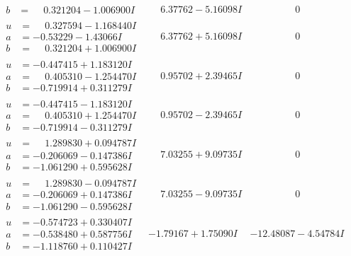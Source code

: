 \documentclass[1p]{elsarticle_modified}
\theoremstyle{definition}
\begin{document}
$$\begin{array}{c|c|c}
\begin{aligned}
b &= \phantom{-}0.321204 - 1.006900 I\end{aligned}
 & \phantom{-}6.37762 - 5.16098 I & \phantom{-0.000000 } 0 \\ \hline\begin{aligned}
u &= \phantom{-}0.327594 - 1.168440 I \\
a &= -0.53229 - 1.43066 I \\
b &= \phantom{-}0.321204 + 1.006900 I\end{aligned}
 & \phantom{-}6.37762 + 5.16098 I & \phantom{-0.000000 } 0 \\ \hline\begin{aligned}
u &= -0.447415 + 1.183120 I \\
a &= \phantom{-}0.405310 - 1.254470 I \\
b &= -0.719914 + 0.311279 I\end{aligned}
 & \phantom{-}0.95702 + 2.39465 I & \phantom{-0.000000 } 0 \\ \hline\begin{aligned}
u &= -0.447415 - 1.183120 I \\
a &= \phantom{-}0.405310 + 1.254470 I \\
b &= -0.719914 - 0.311279 I\end{aligned}
 & \phantom{-}0.95702 - 2.39465 I & \phantom{-0.000000 } 0 \\ \hline\begin{aligned}
u &= \phantom{-}1.289830 + 0.094787 I \\
a &= -0.206069 - 0.147386 I \\
b &= -1.061290 + 0.595628 I\end{aligned}
 & \phantom{-}7.03255 + 9.09735 I & \phantom{-0.000000 } 0 \\ \hline\begin{aligned}
u &= \phantom{-}1.289830 - 0.094787 I \\
a &= -0.206069 + 0.147386 I \\
b &= -1.061290 - 0.595628 I\end{aligned}
 & \phantom{-}7.03255 - 9.09735 I & \phantom{-0.000000 } 0 \\ \hline\begin{aligned}
u &= -0.574723 + 0.330407 I \\
a &= -0.538480 + 0.587756 I \\
b &= -1.118760 + 0.110427 I\end{aligned}
 & -1.79167 + 1.75090 I & -12.48087 - 4.54784 I \\ \hline\begin{aligned}

\end{aligned}
\end{array}$$
\end{document}
